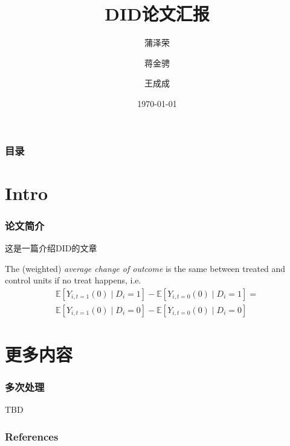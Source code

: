 \documentclass[
  UTF8,
  xcolor={dvipsnames,rgb},
  hyperref={colorlinks, citecolor=magenta, linkcolor=black},
  11pt
]{beamer}
\title{DID论文汇报}
\date{\today}
\author{蒲泽荣 \and 蒋金骋 \and 王成成}
\begin{document}
\begin{frame}
  \maketitle
\end{frame}

\begin{frame}
  \frametitle{目录}

  \tableofcontents

\end{frame}

\section{Intro}

\begin{frame}
  \frametitle{论文简介}

  这是一篇介绍DID的文章 \parencite{Baker.etal2025}

  \begin{assumption}
    The (weighted) \textit{average change of outcome} is the same between treated and control units if no
    treat happens, i.e.
    \begin{align*}
      \mathbb{E}[Y_{i,t=1}(0) \mid D_i=1] - \mathbb{E}[Y_{i,t=0}(0) \mid D_i=1] = \\
      \mathbb{E}[Y_{i,t=1}(0) \mid D_i=0] - \mathbb{E}[Y_{i,t=0}(0) \mid D_i=0]
    \end{align*}
  \end{assumption}

\end{frame}



\section{更多内容}

\begin{frame}
  \frametitle{多次处理}

  TBD

\end{frame}

\appendix

\begin{frame}[allowframebreaks]
  \frametitle{References}
  \printbibliography
\end{frame}
\end{document}
